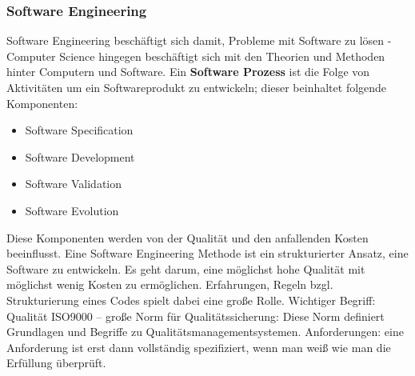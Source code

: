 \documentclass[a4paper,12pt,twoside]{scrreprt}
\begin{document}
\subsubsection{Software Engineering}
Software Engineering beschäftigt sich damit, Probleme mit Software zu lösen - Computer Science hingegen beschäftigt sich mit den Theorien und Methoden hinter Computern und Software. 
Ein \textbf{Software Prozess} ist die Folge von Aktivitäten um ein Softwareprodukt zu entwickeln; dieser beinhaltet folgende Komponenten:
\begin{itemize}
  \item{Software Specification}
  \item{Software Development}
  \item{Software Validation}
  \item{Software Evolution}
\end{itemize}
Diese Komponenten werden von der Qualität und den anfallenden Kosten beeinflusst. 
\newline
Eine Software Engineering Methode ist ein strukturierter Ansatz, eine Software zu entwickeln. 
Es geht darum, eine möglichst hohe Qualität mit möglichst wenig Kosten zu ermöglichen. 
Erfahrungen, Regeln bzgl. Strukturierung eines Codes spielt dabei eine große Rolle.
\newline
Wichtiger Begriff: Qualität\newline
ISO9000 – große Norm für Qualitätssicherung: Diese Norm definiert Grundlagen und Begriffe zu Qualitätsmanagementsystemen.
\newline
Anforderungen: eine Anforderung ist erst dann vollständig spezifiziert, wenn man weiß wie man die Erfüllung überprüft.
\end{document}
